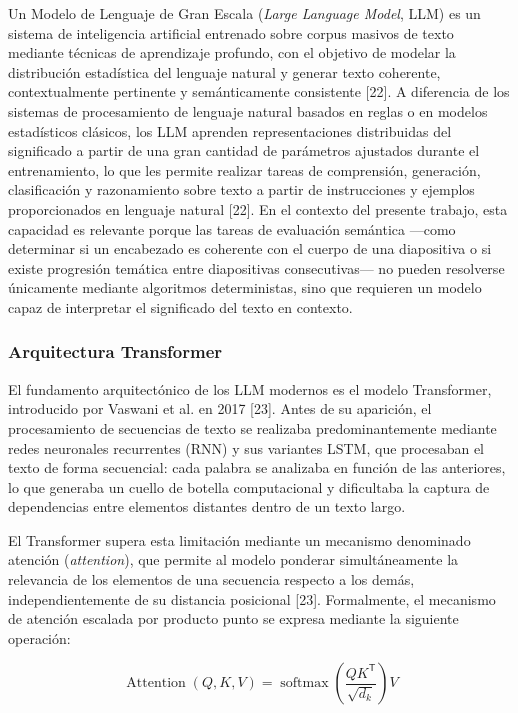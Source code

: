 \documentclass[11pt]{article}
\newif\ifshowttiimarks
\newcommand{\ttiiTOC}[1]{%
  \ifshowttiimarks
    \texorpdfstring{\textcolor{ttiipurple}{\textbf{#1}}}{#1}%
  \else
    #1%
  \fi
}
\begin{document}
Un Modelo de Lenguaje de Gran Escala (\textit{Large Language Model}, LLM) es un sistema de inteligencia artificial entrenado sobre corpus masivos de texto mediante técnicas de aprendizaje profundo, con el objetivo de modelar la distribución estadística del lenguaje natural y generar texto coherente, contextualmente pertinente y semánticamente consistente [22]. A diferencia de los sistemas de procesamiento de lenguaje natural basados en reglas o en modelos estadísticos clásicos, los LLM aprenden representaciones distribuidas del significado a partir de una gran cantidad de parámetros ajustados durante el entrenamiento, lo que les permite realizar tareas de comprensión, generación, clasificación y razonamiento sobre texto a partir de instrucciones y ejemplos proporcionados en lenguaje natural [22]. En el contexto del presente trabajo, esta capacidad es relevante porque las tareas de evaluación semántica —como determinar si un encabezado es coherente con el cuerpo de una diapositiva o si existe progresión temática entre diapositivas consecutivas— no pueden resolverse únicamente mediante algoritmos deterministas, sino que requieren un modelo capaz de interpretar el significado del texto en contexto.

\subsubsection*{Arquitectura Transformer}
\addcontentsline{toc}{subsubsection}{\protect\ttiiTOC{Arquitectura Transformer}}

El fundamento arquitectónico de los LLM modernos es el modelo Transformer, introducido por Vaswani et al. en 2017 [23]. Antes de su aparición, el procesamiento de secuencias de texto se realizaba predominantemente mediante redes neuronales recurrentes (RNN) y sus variantes LSTM, que procesaban el texto de forma secuencial: cada palabra se analizaba en función de las anteriores, lo que generaba un cuello de botella computacional y dificultaba la captura de dependencias entre elementos distantes dentro de un texto largo.

El Transformer supera esta limitación mediante un mecanismo denominado atención (\textit{attention}), que permite al modelo ponderar simultáneamente la relevancia de los elementos de una secuencia respecto a los demás, independientemente de su distancia posicional [23]. Formalmente, el mecanismo de atención escalada por producto punto se expresa mediante la siguiente operación:

\[
\operatorname{Attention}(Q,K,V)
=
\operatorname{softmax}\left(\frac{QK^{\mathsf{T}}}{\sqrt{d_k}}\right)V
\]
\end{document}
